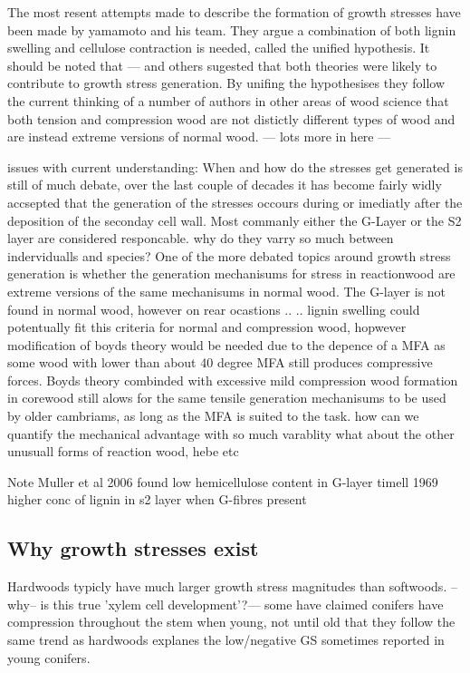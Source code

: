 \documentclass{article}
\begin{document}
The most resent attempts made to describe the formation of growth stresses have
been made by yamamoto and his team. They argue a combination of both lignin
swelling and cellulose contraction is needed, called the unified hypothesis. It
should be noted that --- and others sugested that both theories were likely to
contribute to growth stress generation. By unifing the hypothesises they follow
the current thinking of a number of authors in other areas of wood science that
both tension and compression wood are not distictly different types of wood and
are instead extreme versions of normal wood.
--- lots more in here ---

issues with current understanding:
When and how do the stresses get generated is still of much debate, over the
last couple of decades it has become fairly widly accsepted that the generation
of the stresses occours during or imediatly after the deposition of the seconday
cell wall. Most commanly either the G-Layer or the S2 layer are considered
responcable.
why do they varry so much between indervidualls and species?
One of the more debated topics around growth stress generation is whether the
generation mechanisums for stress in reactionwood are extreme versions of the
same mechanisums in normal wood. The G-layer is not found in normal wood,
however on rear ocastions .. .. lignin swelling could potentually fit this
criteria for normal and compression wood, hopwever modification of boyds theory
would be needed due to the depence of a MFA as some wood with lower than about
40 degree MFA still produces compressive forces. Boyds theory combinded
with excessive mild compression wood formation in corewood still alows
for the same tensile generation mechanisums to be used by older cambriams, as
long as the MFA is suited to the task.
how can we quantify the mechanical advantage with so much varablity
what about the other unusuall forms of reaction wood, hebe etc

Note Muller et al 2006 found low hemicellulose content in G-layer
timell 1969 higher conc of lignin in s2 layer when G-fibres present

\subsection{Why growth stresses exist}
Hardwoods typicly have much larger growth stress magnitudes than softwoods.
--why-- is this true 'xylem cell development'?--- some have claimed conifers
have compression throughout the stem when young, not until old that they follow the same trend as
hardwoods explanes the low/negative GS sometimes reported in young conifers.
\end{document}
